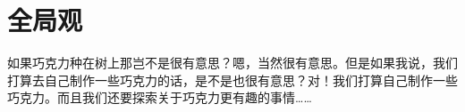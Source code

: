 \chapter{全局观}
    如果巧克力种在树上那岂不是很有意思？嗯，当然很有意思。但是如果我说，我们打算去自己制作一些巧克力的话，是不是也很有意思？对！我们打算自己制作一些巧克力。而且我们还要探索关于巧克力更有趣的事情……

